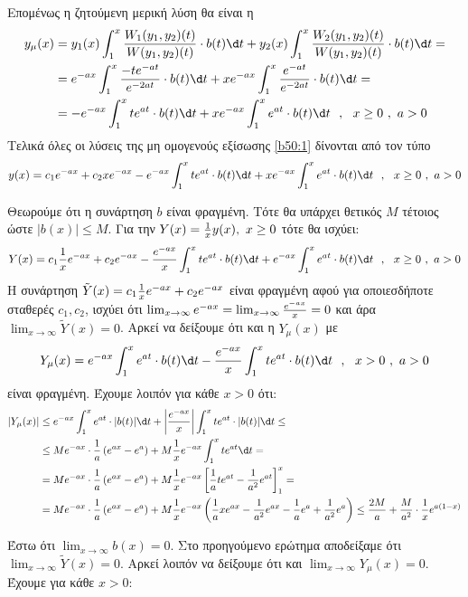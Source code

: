 \documentclass[a4paper,twoside,11pt]{book}
\DeclareRobustCommand{\frac}[3][0pt]{%
{\begingroup\hspace{#1}#2\hspace{#1}\endgroup\over\hspace{#1}#3\hspace{#1}}}
\begin{document}
Επομένως η ζητούμενη μερική λύση θα είναι η
\begin{align*}
y_\mu(x)&=y_1(x)\int_{1}^{x}{\frac{W_1(y_1,y_2)(t)}{W(y_1,y_2)(t)}\cdot b(t)\d t}+y_2(x)\int_{1}^{x}{\frac{W_2(y_1,y_2)(t)}{W(y_1,y_2)(t)}\cdot b(t)\d t}=\\
&=e^{-ax}\int_{1}^{x}{\frac{-te^{-at}}{e^{-2at}}\cdot b(t)\d t}+xe^{-ax}\int_{1}^{x}{\frac{e^{-at}}{e^{-2at}}\cdot b(t)\d t}=\\
&=-e^{-ax}\int_{1}^{x}{te^{at}\cdot b(t)\d t}+xe^{-ax}\int_{1}^{x}{e^{at}\cdot b(t)\d t}\ \ ,\ \ x\geq 0\ ,\ a>0
\end{align*}
Τελικά όλες οι λύσεις της μη ομογενούς εξίσωσης \eqref{b50:1} δίνονται από τον τύπο
\[ y(x)=c_1e^{-ax}+c_2xe^{-ax}-e^{-ax}\int_{1}^{x}{te^{at}\cdot b(t)\d t}+xe^{-ax}\int_{1}^{x}{e^{at}\cdot b(t)\d t}\ \ ,\ \ x\geq 0\ ,\ a>0 \]
\begin{rlist}
\item Θεωρούμε ότι η συνάρτηση $ b $ είναι φραγμένη. Τότε θα υπάρχει θετικός $ M $ τέτοιος ώστε $ |b(x)|\leq M $. Για την $ Y(x)=\frac{1}{x}y(x),\ x\geq 0 $ τότε θα ισχύει:
\[ Y(x)=c_1\frac{1}{x}e^{-ax}+c_2e^{-ax}-\frac{e^{-ax}}{x}\int_{1}^{x}{te^{at}\cdot b(t)\d t}+e^{-ax}\int_{1}^{x}{e^{at}\cdot b(t)\d t}\ \ ,\ \ x\geq 0\ ,\ a>0 \]
Η συνάρτηση $ \tilde{Y}(x)=c_1\frac{1}{x}e^{-ax}+c_2e^{-ax} $ είναι φραγμένη αφού για οποιεσδήποτε σταθερές $ c_1,c_2 $, ισχύει ότι $ \lim_{x\to\infty}{e^{-ax}}=\lim_{x\to\infty}{\frac{e^{-ax}}{x}}=0 $ και άρα $ \lim_{x\to\infty}{\tilde{Y}(x)}=0 $. Αρκεί να δείξουμε ότι και η $ Y_\mu(x) $ με 
\[ Y_\mu(x)=e^{-ax}\int_{1}^{x}{e^{at}\cdot b(t)\d t}-\frac{e^{-ax}}{x}\int_{1}^{x}{te^{at}\cdot b(t)\d t}\ \ ,\ \ x>0\ ,\ a>0 \]
είναι φραγμένη. Έχουμε λοιπόν για κάθε $ x>0 $ ότι:
\begin{align*}
|Y_\mu(x)|&\leq e^{-ax}\int_{1}^{x}{e^{at}\cdot |b(t)|\d t}+\left| \frac{e^{-ax}}{x}\right| \int_{1}^{x}{te^{at}\cdot |b(t)|\d t}\leq\\
&\leq Me^{-ax}\cdot\frac{1}{a}\left(e^{ax}-e^a \right)+M\frac{1}{x}e^{-ax}\int_{1}^{x}{te^{at}\d t}=\\
&=Me^{-ax}\cdot\frac{1}{a}\left(e^{ax}-e^a \right)+M\frac{1}{x}e^{-ax}\left[\frac{1}{a}te^{at}-\frac{1}{a^2}e^{at} \right]_{1}^{x}=\\
&=Me^{-ax}\cdot\frac{1}{a}\left(e^{ax}-e^a \right)+M\frac{1}{x}e^{-ax}\left(\frac{1}{a}xe^{ax}-\frac{1}{a^2}e^{ax}-\frac{1}{a}e^{a}+\frac{1}{a^2}e^{a} \right)\leq \frac{2M}{a}+\frac{M}{a^2}\cdot\frac{1}{x}e^{a(1-x)}
\end{align*}
\item Έστω ότι $ \lim_{x\to\infty}{b(x)}=0 $. Στο προηγούμενο ερώτημα αποδείξαμε ότι $ \lim_{x\to\infty}{\tilde{Y}(x)}=0 $. Αρκεί λοιπόν να δείξουμε ότι και $ \lim_{x\to\infty}{Y_\mu(x)}=0 $. Έχουμε για κάθε $ x>0 $:

\end{rlist}
\end{document}
